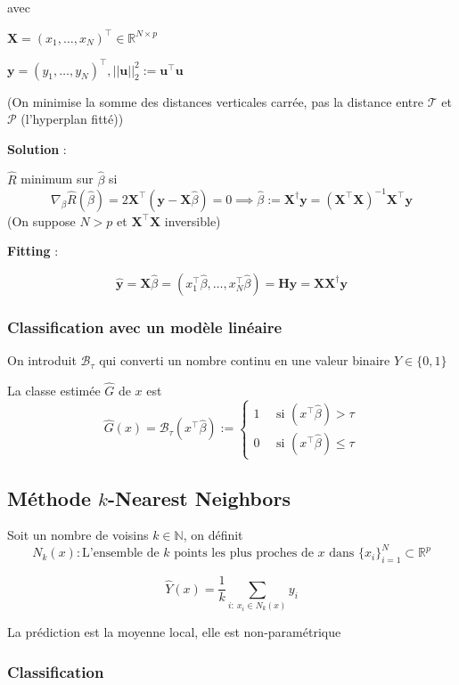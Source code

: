 \documentclass[12pt,a4paper]{article}
\begin{document}
avec

$\mathbf{X} = (x_1,\dots,x_N)^\top \in \mathbb{R}^{N\times p}$

$\mathbf{y} = (y_1,\dots, y_N)^\top, ||\mathbf{u}||_2^2 := \mathbf{u}^\top \mathbf{u}$

(On minimise la somme des distances verticales carrée, pas la distance entre $\mathcal{T}$ et $\mathcal{P}$ (l'hyperplan fitté))


\textbf{Solution} :

$\hat{R}$ minimum sur $\hat{\beta}$ si
$$\nabla_{\beta} \hat{R}(\hat{\beta}) = 2\mathbf{X}^{\top}(\mathbf{y} - \mathbf{X}\hat{\beta}) = 0 \implies \hat{\beta} := \mathbf{X}^{\dagger}\mathbf{y} = (\mathbf{X}^{\top}\mathbf{X})^{-1}\mathbf{X}^{\top}\mathbf{y}$$
(On suppose $N>p$ et $\mathbf{X}^\top \mathbf{X}$ inversible)

\textbf{Fitting} :

$$\hat{\mathbf{y}} = \mathbf{X} \hat{\beta} = (x_1^\top \hat{\beta},\dots, x_N^\top \hat{\beta}) = \mathbf{Hy} = \mathbf{X X^\dagger y}$$


\subsubsection{Classification avec un modèle linéaire}

On introduit $\mathcal{B}_\tau$ qui converti un nombre continu en une valeur binaire $Y \in \{0,1\}$

La classe estimée $\hat{G}$ de $x$ est
$$\hat{G}(x) = \mathcal{B}_\tau (x^\top \hat{\beta}) := \begin{cases}
    1 \quad \text{ si } (x^\top \hat{\beta}) > \tau\\
    0 \quad \text{ si } (x^\top \hat{\beta}) \leq \tau
\end{cases}$$

\subsection{Méthode $k$-Nearest Neighbors}

Soit un nombre de voisins $k \in \mathbb{N}$, on définit
$$N_k(x) : \text{L'ensemble de $k$ points les plus proches de $x$ dans $\{x_i\}_{i=1}^N \subset \mathbb{R}^p$}$$

$$\hat{Y}(x) = \frac{1}{k} \sum_{i:\: x_i \in N_k(x)} y_i$$

La prédiction est la moyenne local, elle est non-paramétrique

\subsubsection{Classification}
\end{document}
